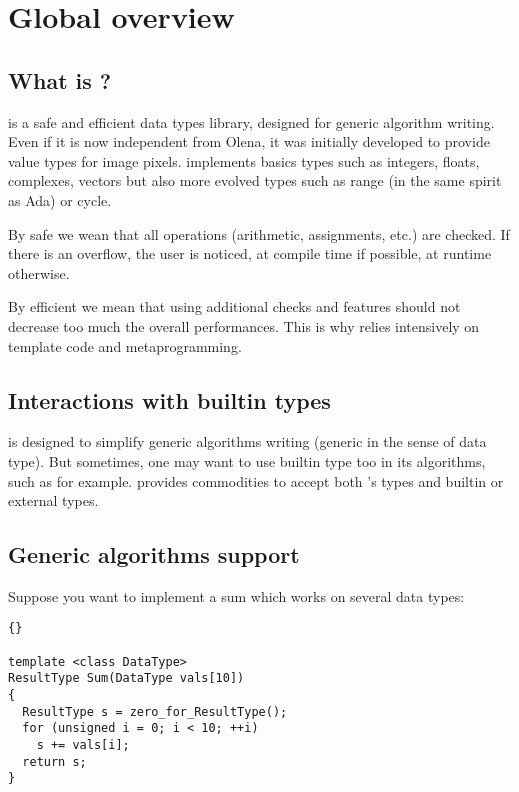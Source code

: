 \section{Global overview}

\subsection{What is {\integre} ?}

{\integre} is a safe and efficient data types library, designed for
generic algorithm writing. Even if it is now independent from Olena,
it was initially developed to provide value types for image pixels.
{\integre} implements basics types such as integers, floats,
complexes, vectors but also more evolved types such as range (in the
same spirit as Ada) or cycle.

By safe we wean that all operations (arithmetic, assignments, etc.)
are checked. If there is an overflow, the user is noticed, at compile
time if possible, at runtime otherwise.

By efficient we mean that using {\integre} additional checks and
features should not decrease too much the overall performances. This
is why {\integre} relies intensively on template code and
metaprogramming.

\subsection{Interactions with builtin types}

{\integre} is designed to simplify generic algorithms writing (generic
in the sense of data type). But sometimes, one may want to use builtin
type too in its algorithms, such as  for example. {\integre}
provides commodities to accept both {\integre}'s types and builtin or
external types.

\subsection{Generic algorithms support}

Suppose you want to implement a sum which works on several data types:


\begin{lstlisting}{}

template <class DataType>
ResultType Sum(DataType vals[10])
{
  ResultType s = zero_for_ResultType();
  for (unsigned i = 0; i < 10; ++i)
    s += vals[i];
  return s;
}

\end{lstlisting}

